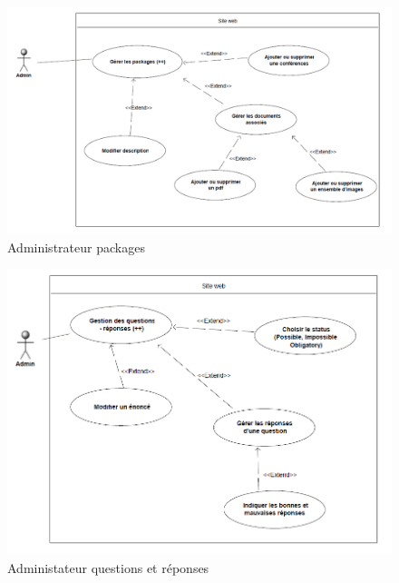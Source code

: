    \begin{figure}[h]
        \begin{center}
            \includegraphics[scale=0.50]{images/uml/adminPackages.png} 
        \end{center}

        \caption{Administrateur packages}
        \label{Administrateur packages}
    \end{figure}

    \begin{figure}[h]
        \begin{center}
            \includegraphics[scale=0.50]{images/uml/adminQuestionsReponses.png} 
        \end{center}

        \caption{Administateur questions et réponses}
        \label{Administateur questions et réponses}
    \end{figure}

